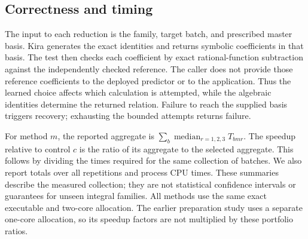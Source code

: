 \subsection{Correctness and timing}
The input to each reduction is the family, target batch, and prescribed master basis. Kira generates the exact identities and returns symbolic coefficients in that basis. The test then checks each coefficient by exact rational-function subtraction against the independently checked reference. The caller does not provide those reference coefficients to the deployed predictor or to the application. Thus the learned choice affects which calculation is attempted, while the algebraic identities determine the returned relation. Failure to reach the supplied basis triggers recovery; exhausting the bounded attempts returns failure.

For method $m$, the reported aggregate is $\sum_b\operatorname{median}_{r=1,2,3}T_{bmr}$. The speedup relative to control $c$ is the ratio of its aggregate to the selected aggregate. This follows by dividing the times required for the same collection of batches. We also report totals over all repetitions and process CPU times. These summaries describe the measured collection; they are not statistical confidence intervals or guarantees for unseen integral families. All methods use the same exact executable and two-core allocation. The earlier preparation study uses a separate one-core allocation, so its speedup factors are not multiplied by these portfolio ratios.
